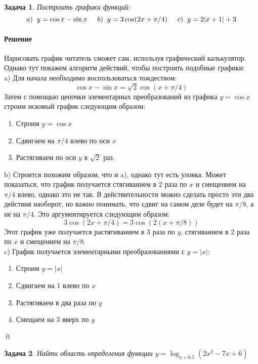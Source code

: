 \documentclass[a4paper,12pt]{report}
\newtheorem{problem}{Задача}[chapter]
\newenvironment{sol}{\paragraph{Решение}}{}
\begin{document}
	\begin{problem}
		Построить графики функций:
		\[
		a) \hspace{2mm} y=\cos x - \sin x \hspace{5mm} b) \hspace{2mm} y=3\cos(2x+\pi / 4) \hspace{5mm} c) \hspace{2mm} y=2|x+1|+3
		\]
	\end{problem}
	\begin{sol}
		Нарисовать график читатель сможет сам, используя графический калькулятор. Однако тут покажем алгоритм действий, чтобы построить подобные графики:\\
		a) Для начала необходимо воспользоваться тождеством:
		\[
		\cos x - \sin x = \sqrt{2}\cos({x+\pi/4})
		\]
		Затем с помощью цепочки элементарных преобразований из графика $y=\cos x$ строим искомый график следующим образом:
		\begin{enumerate}
			\item Строим $y=\cos x$
			\item Сдвигаем на $\pi/4$ влево по оси $x$
			\item Растягиваем по оси $y$ в $\sqrt{2}$ раз.
		\end{enumerate}
		b) Строится похожим образом, что и a), однако тут есть уловка. Может показаться, что график получается стягиванием в 2 раза по $x$ и смещением на $\pi/4$ влево, однако это не так. В действительности можно сделать просто эти два действия наоборот, но важно понимать, что сдвиг на самом деле будет на $\pi/8$, а не на $\pi/4$. Это аргументируется следующим образом:
		\[
		3\cos (2x+\pi/4)=3\cos (2(x+\pi/8))
		\]
		Этот график уже получается растягиванием в 3 раза по $y$, стягиванием в 2 раза по $x$ и смещением на $\pi/8$.\\
		c) График получается элементарными преобразованиями с $y=|x|$:
		\begin{enumerate}
			\item Строим $y=|x|$
			\item Сдвигаем на 1 влево по $x$
			\item Растягиваем в два раза по $y$
			\item Смещаем на 3 вверх по $y$
		\end{enumerate}
		\qed
	\end{sol}
	
	\begin{problem}
		Найти область определения функции $y=\log_{x+0.5}(2x^2-7x+6)$
	\end{problem}
	
\end{document}

